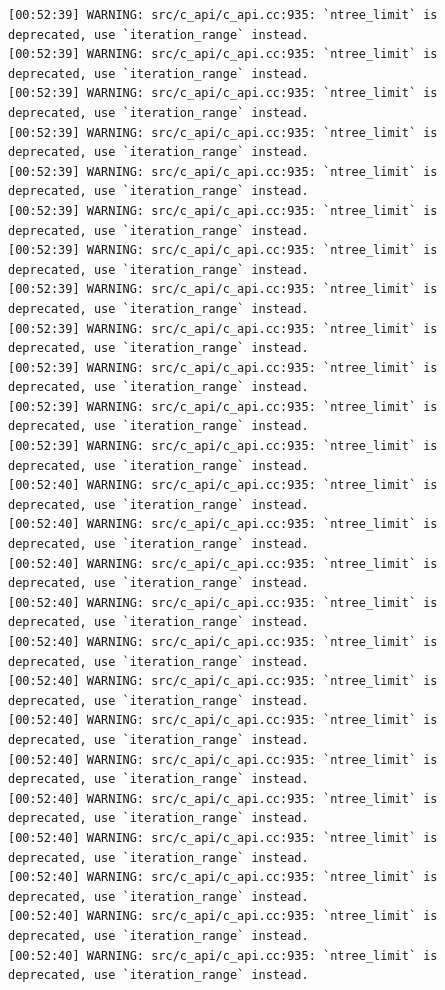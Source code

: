 \documentclass[
  letterpaper,
  DIV=11,
  numbers=noendperiod]{scrartcl}
\begin{document}
\begin{verbatim}
[00:52:39] WARNING: src/c_api/c_api.cc:935: `ntree_limit` is deprecated, use `iteration_range` instead.
[00:52:39] WARNING: src/c_api/c_api.cc:935: `ntree_limit` is deprecated, use `iteration_range` instead.
[00:52:39] WARNING: src/c_api/c_api.cc:935: `ntree_limit` is deprecated, use `iteration_range` instead.
[00:52:39] WARNING: src/c_api/c_api.cc:935: `ntree_limit` is deprecated, use `iteration_range` instead.
[00:52:39] WARNING: src/c_api/c_api.cc:935: `ntree_limit` is deprecated, use `iteration_range` instead.
[00:52:39] WARNING: src/c_api/c_api.cc:935: `ntree_limit` is deprecated, use `iteration_range` instead.
[00:52:39] WARNING: src/c_api/c_api.cc:935: `ntree_limit` is deprecated, use `iteration_range` instead.
[00:52:39] WARNING: src/c_api/c_api.cc:935: `ntree_limit` is deprecated, use `iteration_range` instead.
[00:52:39] WARNING: src/c_api/c_api.cc:935: `ntree_limit` is deprecated, use `iteration_range` instead.
[00:52:39] WARNING: src/c_api/c_api.cc:935: `ntree_limit` is deprecated, use `iteration_range` instead.
[00:52:39] WARNING: src/c_api/c_api.cc:935: `ntree_limit` is deprecated, use `iteration_range` instead.
[00:52:39] WARNING: src/c_api/c_api.cc:935: `ntree_limit` is deprecated, use `iteration_range` instead.
[00:52:40] WARNING: src/c_api/c_api.cc:935: `ntree_limit` is deprecated, use `iteration_range` instead.
[00:52:40] WARNING: src/c_api/c_api.cc:935: `ntree_limit` is deprecated, use `iteration_range` instead.
[00:52:40] WARNING: src/c_api/c_api.cc:935: `ntree_limit` is deprecated, use `iteration_range` instead.
[00:52:40] WARNING: src/c_api/c_api.cc:935: `ntree_limit` is deprecated, use `iteration_range` instead.
[00:52:40] WARNING: src/c_api/c_api.cc:935: `ntree_limit` is deprecated, use `iteration_range` instead.
[00:52:40] WARNING: src/c_api/c_api.cc:935: `ntree_limit` is deprecated, use `iteration_range` instead.
[00:52:40] WARNING: src/c_api/c_api.cc:935: `ntree_limit` is deprecated, use `iteration_range` instead.
[00:52:40] WARNING: src/c_api/c_api.cc:935: `ntree_limit` is deprecated, use `iteration_range` instead.
[00:52:40] WARNING: src/c_api/c_api.cc:935: `ntree_limit` is deprecated, use `iteration_range` instead.
[00:52:40] WARNING: src/c_api/c_api.cc:935: `ntree_limit` is deprecated, use `iteration_range` instead.
[00:52:40] WARNING: src/c_api/c_api.cc:935: `ntree_limit` is deprecated, use `iteration_range` instead.
[00:52:40] WARNING: src/c_api/c_api.cc:935: `ntree_limit` is deprecated, use `iteration_range` instead.
[00:52:40] WARNING: src/c_api/c_api.cc:935: `ntree_limit` is deprecated, use `iteration_range` instead.

\end{verbatim}
\end{document}
